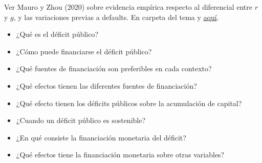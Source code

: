 \documentclass{nuevotema}
\begin{document}
\ideaclave

Ver Mauro y Zhou (2020) sobre evidencia empírica respecto al diferencial entre $r$ y $g$, y las variaciones previas a defaults. En carpeta del tema y \href{https://www.imf.org/en/Publications/WP/Issues/2020/03/13/r-minus-g-negative-Can-We-Sleep-More-Soundly-49068}{aquí}.


\begin{itemize}
	\item ¿Qué es el déficit público?
	\item ¿Cómo puede financiarse el déficit público?
	\item ¿Qué fuentes de financiación son preferibles en cada contexto?
	\item ¿Qué efectos tienen las diferentes fuentes de financiación?
	\item ¿Qué efecto tienen los déficits públicos sobre la acumulación de capital?
	\item ¿Cuando un déficit público es sostenible?
	\item ¿En qué consiste la financiación monetaria del déficit?
	\item ¿Qué efectos tiene la financiación monetaria sobre otras variables?
\end{itemize}

\esquemacorto
\end{document}

